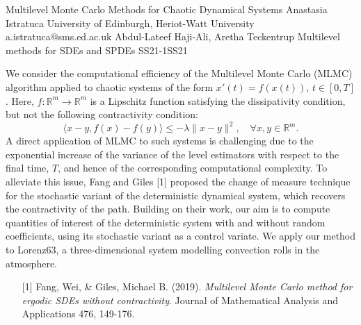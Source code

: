 \begin{talk}
  {Multilevel Monte Carlo Methods for Chaotic Dynamical Systems}%
  {Anastasia Istratuca}%
  {University of Edinburgh, Heriot-Watt University}%
  {a.istratuca@sms.ed.ac.uk}%
  {Abdul-Lateef Haji-Ali, Aretha Teckentrup}%
{Multilevel methods for SDEs and SPDEs}
{}{SS21-1}{SS21}

			

\medskip

We consider the computational efficiency of the Multilevel Monte Carlo (MLMC) algorithm applied to chaotic systems of the form $x'(t) = f(x(t)), \, t \in [0, T]$. Here, $f : \mathbb{R}^m \rightarrow \mathbb{R}^m$ is a Lipschitz function satisfying the dissipativity condition, but not the following contractivity condition:
\begin{equation}
    \langle x-y, f(x)-f(y) \rangle \leq - \lambda \|x-y\|^2, \quad \forall x, y \in \mathbb{R}^m.
\end{equation}
A direct application of MLMC to such systems is challenging due to the exponential increase of the variance of the level estimators with respect to the final time, $T$, and hence of the corresponding computational complexity. To alleviate this issue, Fang and Giles [1] proposed the change of measure technique for the stochastic variant of the deterministic dynamical system, which recovers the contractivity of the path. Building on their work, our aim is to compute quantities of interest of the deterministic system with and without random coefficients, using its stochastic variant as a control variate. We apply our method to Lorenz63, a three-dimensional system modelling convection rolls in the atmosphere.

\begin{enumerate}
	\item[{[1]}] Fang, Wei, \& Giles, Michael B. (2019). {\it Multilevel Monte Carlo method for ergodic SDEs without contractivity}. Journal of Mathematical Analysis and Applications 476, 149-176.
\end{enumerate}



\end{talk}
